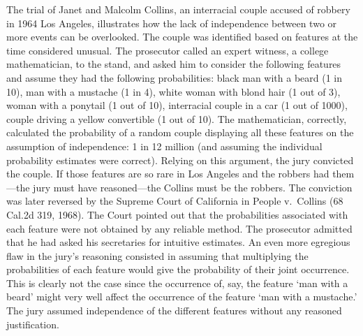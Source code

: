 \documentclass{article}
\begin{document}
The trial of Janet and Malcolm Collins, an interracial couple accused of robbery in 1964 Los Angeles, illustrates how 
the lack of independence between two or more events can be overlooked. The couple was identified based on features at the time considered unusual. The prosecutor called an expert witness, a college mathematician, to the stand, and asked him to consider the following features and assume they had the following  probabilities: black man with a beard (1 in 10), man with a mustache (1 in 4), white woman with blond hair (1 out of 3), woman with a ponytail (1 out of 10), interracial couple in a car (1 out of 1000), couple driving a yellow convertible (1 out of 10). The mathematician, correctly, calculated the probability of a random couple displaying all these features on the assumption of independence: 1 in 12 million (and assuming the individual probability estimates were correct). Relying on this argument, the jury convicted the couple. If  those features are so rare in Los Angeles and the robbers had them---the jury must have reasoned---the Collins must be the robbers. 
%
The conviction was later reversed by the Supreme Court of California in People v.\ Collins (68 Cal.2d 319, 1968).
The Court pointed out that the probabilities associated with each feature were not obtained by any reliable method. The prosecutor admitted that he had asked his secretaries for intuitive estimates.
An even more egregious flaw in the jury's reasoning consisted in assuming that multiplying the probabilities of each feature would give the probability of their joint occurrence. This is clearly not the case since the occurrence of, say, the feature `man with a beard' might very well affect the occurrence of the feature `man with a mustache.' The jury assumed independence of the different features without any reasoned justification.
\end{document}
